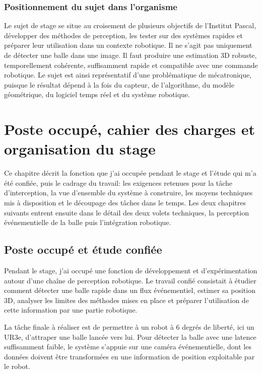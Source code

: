 \documentclass[a4paper,11pt]{report}
\begin{document}
\subsection*{Positionnement du sujet dans l'organisme}

Le sujet de stage se situe au croisement de plusieurs objectifs de l'Institut Pascal, développer des méthodes de perception, les tester sur des systèmes rapides et préparer leur utilisation dans un contexte robotique. Il ne s'agit pas uniquement de détecter une balle dans une image. Il faut produire une estimation 3D robuste, temporellement cohérente, suffisamment rapide et compatible avec une commande robotique. Le sujet est ainsi représentatif d'une problématique de mécatronique, puisque le résultat dépend à la fois du capteur, de l'algorithme, du modèle géométrique, du logiciel temps réel et du système robotique.

\chapter{Poste occupé, cahier des charges et organisation du stage}
\label{chap:poste-cadrage}

Ce chapitre décrit la fonction que j'ai occupée pendant le stage et l'étude qui
m'a été confiée, puis le cadrage du travail: les exigences retenues pour la
tâche d'interception, la vue d'ensemble du système à construire, les moyens
techniques mis à disposition et le découpage des tâches dans le temps. Les deux
chapitres suivants entrent ensuite dans le détail des deux volets techniques, la
perception événementielle de la balle puis l'intégration robotique.

\section{Poste occupé et étude confiée}

Pendant le stage, j'ai occupé une fonction de développement et d'expérimentation autour d'une chaîne de perception robotique. Le travail confié consistait à étudier comment détecter une balle rapide dans un flux événementiel, estimer sa position 3D, analyser les limites des méthodes mises en place et préparer l'utilisation de cette information par une partie robotique.

La tâche finale à réaliser est de permettre à un robot à 6 degrés de liberté, ici un UR3e, d'attraper une balle lancée vers lui. Pour détecter la balle avec une latence suffisamment faible, le système s'appuie sur une caméra événementielle, dont les données doivent être transformées en une information de position exploitable par le robot.
\end{document}
